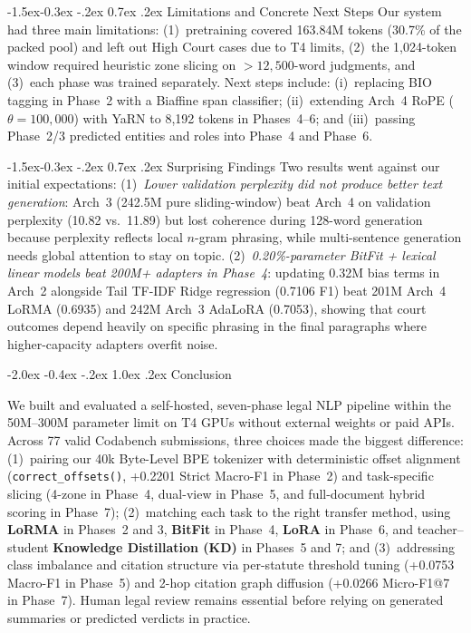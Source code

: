 \documentclass[11pt, oneside]{article}
\makeatletter
\renewcommand\section{\@startsection {section}{1}{\z@}%
  {-2.0ex \@plus -0.4ex \@minus -.2ex}%
  {1.0ex \@plus.2ex}%
  {\normalfont\Large\bfseries}}
\renewcommand\subsection{\@startsection{subsection}{2}{\z@}%
  {-1.5ex\@plus -0.3ex \@minus -.2ex}%
  {0.7ex \@plus .2ex}%
  {\normalfont\large\bfseries}}
\makeatother
\begin{document}
\subsection{Limitations and Concrete Next Steps}
Our system had three main limitations: (1)~pretraining covered 163.84M tokens (30.7\% of the packed pool) and left out High Court cases due to T4 limits, (2)~the 1,024-token window required heuristic zone slicing on $>12,500$-word judgments, and (3)~each phase was trained separately. Next steps include: (i)~replacing BIO tagging in Phase~2 with a Biaffine span classifier; (ii)~extending Arch~4 RoPE ($\theta=100,000$) with YaRN to 8,192 tokens in Phases~4--6; and (iii)~passing Phase~2/3 predicted entities and roles into Phase~4 and Phase~6.

\subsection{Surprising Findings}
Two results went against our initial expectations: (1)~\emph{Lower validation perplexity did not produce better text generation}: Arch~3 (242.5M pure sliding-window) beat Arch~4 on validation perplexity (10.82 vs.\ 11.89) but lost coherence during 128-word generation because perplexity reflects local $n$-gram phrasing, while multi-sentence generation needs global attention to stay on topic. (2)~\emph{0.20\%-parameter BitFit + lexical linear models beat 200M+ adapters in Phase~4}: updating 0.32M bias terms in Arch~2 alongside Tail TF-IDF Ridge regression (0.7106 F1) beat 201M Arch~4 LoRMA (0.6935) and 242M Arch~3 AdaLoRA (0.7053), showing that court outcomes depend heavily on specific phrasing in the final paragraphs where higher-capacity adapters overfit noise.

\section{Conclusion}

We built and evaluated a self-hosted, seven-phase legal NLP pipeline within the 50M--300M parameter limit on T4 GPUs without external weights or paid APIs. Across 77 valid Codabench submissions, three choices made the biggest difference: (1)~pairing our 40k Byte-Level BPE tokenizer with deterministic offset alignment (\texttt{correct\_offsets()}, +0.2201 Strict Macro-F1 in Phase~2) and task-specific slicing (4-zone in Phase~4, dual-view in Phase~5, and full-document hybrid scoring in Phase~7); (2)~matching each task to the right transfer method, using \textbf{LoRMA} in Phases~2 and 3, \textbf{BitFit} in Phase~4, \textbf{LoRA} in Phase~6, and teacher--student \textbf{Knowledge Distillation (KD)} in Phases~5 and 7; and (3)~addressing class imbalance and citation structure via per-statute threshold tuning (+0.0753 Macro-F1 in Phase~5) and 2-hop citation graph diffusion (+0.0266 Micro-F1@7 in Phase~7). Human legal review remains essential before relying on generated summaries or predicted verdicts in practice.
\end{document}
